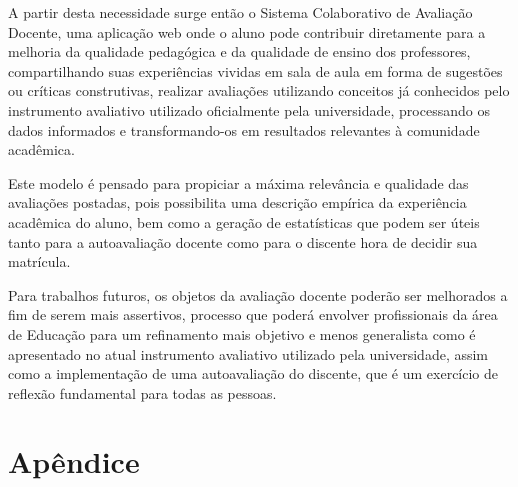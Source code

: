 \documentclass[12pt, a4paper]{report}
\begin{document}
A partir desta necessidade surge então o Sistema Colaborativo de Avaliação Docente, uma aplicação web onde o aluno pode contribuir diretamente para a melhoria  da qualidade pedagógica e da qualidade de ensino dos professores, compartilhando suas experiências vividas em sala de aula em forma de sugestões ou críticas construtivas, realizar avaliações utilizando conceitos já conhecidos pelo instrumento avaliativo utilizado oficialmente pela universidade, processando os dados informados e transformando-os em resultados relevantes à comunidade acadêmica.

Este modelo é pensado para propiciar a máxima relevância e qualidade das avaliações postadas, pois possibilita uma descrição empírica da experiência acadêmica do aluno, bem como a geração de estatísticas que podem ser úteis tanto para a autoavaliação docente como para o discente  hora de decidir sua matrícula.

Para trabalhos futuros, os objetos da avaliação docente poderão ser melhorados a fim de serem mais assertivos, processo que poderá envolver profissionais da área de Educação para um refinamento mais objetivo e menos generalista como é apresentado no atual instrumento avaliativo utilizado pela universidade, assim como a implementação de uma autoavaliação do discente, que é um exercício de reflexão fundamental para todas as pessoas. 

\renewcommand\bibname{Referências}

%
%

\nocite{*}

\appendix
\chapter{Apêndice}
\label{ape:apendice}




\end{document}
